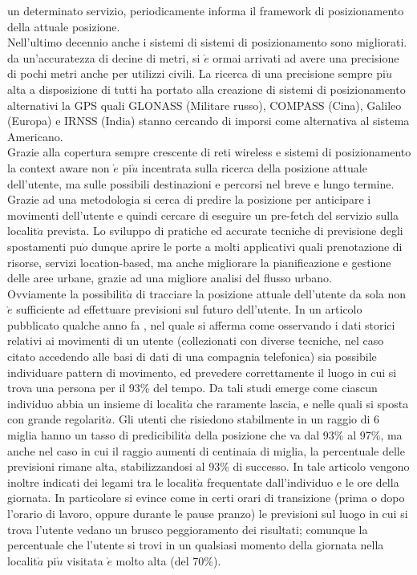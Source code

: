 un determinato servizio, periodicamente informa il framework di posizionamento
della attuale posizione.\\
Nell'ultimo decennio anche i sistemi di sistemi di posizionamento sono migliorati.
da un'accuratezza di decine di metri, si $\grave{e}$ ormai arrivati ad avere una precisione
di pochi metri anche per utilizzi civili. La ricerca di una precisione sempre
pi$\grave{u}$ alta a disposizione di tutti ha portato alla creazione di sistemi di posizionamento
alternativi la GPS quali GLONASS (Militare russo), COMPASS (Cina), Galileo (Europa) e IRNSS (India)
stanno cercando di imporsi come alternativa al sistema Americano.\\
Grazie alla copertura sempre crescente di reti wireless e sistemi di posizionamento la
context aware non $\grave{e}$ pi$\grave{u}$ incentrata sulla ricerca della posizione attuale dell'utente, ma sulle possibili destinazioni
e percorsi nel breve e lungo termine. Grazie ad una metodologia si cerca di predire la posizione
per anticipare i movimenti dell'utente e quindi cercare di eseguire un pre-fetch
del servizio sulla localit$\grave{a}$ prevista.
Lo sviluppo di pratiche ed accurate tecniche di previsione degli spostamenti
pu$\grave{o}$ dunque aprire le porte a molti applicativi quali prenotazione di risorse,
servizi location-based, ma anche migliorare la pianificazione e gestione delle
aree urbane, grazie ad una migliore analisi del flusso urbano.\\
Ovviamente la possibilit$\grave{a}$ di tracciare la posizione attuale dell'utente da sola non $\grave{e}$ sufficiente
ad effettuare previsioni sul futuro dell'utente. In un articolo pubblicato qualche anno fa
 \cite{new_1}, nel quale si afferma come osservando i dati storici relativi ai movimenti di un utente
(collezionati con diverse tecniche, nel caso citato accedendo alle basi di dati di una compagnia telefonica)
sia possibile individuare pattern di movimento, ed prevedere correttamente il luogo in cui
si trova una persona per il 93\% del tempo. Da tali studi emerge come ciascun
individuo abbia un insieme di localit$\grave{a}$ che raramente lascia, e nelle quali si
sposta con grande regolarit$\grave{a}$. Gli utenti che risiedono stabilmente in un raggio
di 6 miglia hanno un tasso di predicibilit$\grave{a}$ della posizione che va dal 93\% al
97\%, ma anche nel caso in cui il raggio aumenti di centinaia di miglia, la
percentuale delle previsioni rimane alta, stabilizzandosi al 93\% di successo.
In tale articolo vengono inoltre indicati dei legami tra le localit$\grave{a}$ frequentate
dall'individuo e le ore della giornata. In particolare si evince come in
certi orari di transizione (prima o dopo l'orario di lavoro, oppure durante le
pause pranzo) le previsioni sul luogo in cui si trova l'utente vedano un brusco
peggioramento dei risultati; comunque la percentuale che l'utente si trovi in
un qualsiasi momento della giornata nella localit$\grave{a}$ pi$\grave{u}$ visitata $\grave{e}$ molto alta (del
70\%).

